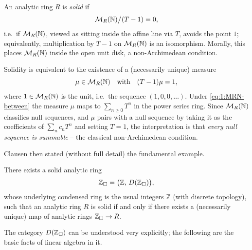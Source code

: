\begin{definition}
\label{def:1:solid}
An analytic ring $R$ is \emph{solid} if
\begin{equation*}
\mathcal{M}_R(\mathbb{N})\big/(T-1)=0,
\end{equation*}
i.e.\ if $\mathcal{M}_R(\mathbb{N})$, viewed as sitting inside the affine line via
$T$, avoids the point $1$; equivalently, multiplication by $T-1$ on
$\mathcal{M}_R(\mathbb{N})$ is an isomorphism. Morally, this places
$\mathcal{M}_R(\mathbb{N})$ inside the open unit disk, a non-Archimedean condition.
\end{definition}

\begin{remark}
\label{rmk:1:solid-summable}
Solidity is equivalent to the existence of a (necessarily unique) measure
\begin{equation*}
\mu\in\mathcal{M}_R(\mathbb{N})\quad\text{with}\quad (T-1)\mu=1,
\end{equation*}
where $1\in\mathcal{M}_R(\mathbb{N})$ is the unit, i.e.\ the sequence
$(1,0,0,\dots)$. Under \eqref{eq:1:MRN-between} the measure $\mu$ maps to
$\sum_{n\geq 0} T^{n}$ in the power series ring. Since $\mathcal{M}_R(\mathbb{N})$
classifies null sequences, and $\mu$ pairs with a null sequence by taking it as
the coefficients of $\sum_n c_n T^n$ and setting $T=1$, the interpretation is
that \emph{every null sequence is summable} -- the classical non-Archimedean
condition.
\end{remark}

Clausen then stated (without full detail) the fundamental example.

\begin{theorem}
\label{thm:1:Zsolid}
There exists a solid analytic ring
\[
\mathbb{Z}_{\square}=\bigl(\mathbb{Z},\,D(\mathbb{Z}_{\square})\bigr),
\]
whose underlying condensed ring is the usual integers $\mathbb{Z}$ (with discrete
topology), such that an analytic ring $R$ is solid if and only if there exists a
(necessarily unique) map of analytic rings $\mathbb{Z}_{\square}\to R$.
\end{theorem}

The category $D(\mathbb{Z}_{\square})$ can be understood very explicitly; the following are
the basic facts of linear algebra in it.

